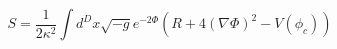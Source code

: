 \begin{equation}
S = \frac1{2\kappa^2}\int d^Dx\sqrt{-g}e^{-2\Phi}(R+4(\nabla\Phi)^2-V(\phi_c))
    \label{SFaction}
\end{equation}

